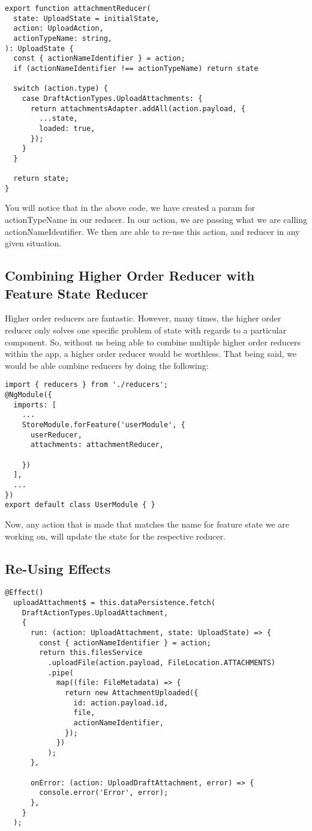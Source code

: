 \begin{lstlisting}
export function attachmentReducer(
  state: UploadState = initialState,
  action: UploadAction,
  actionTypeName: string,
): UploadState {
  const { actionNameIdentifier } = action;
  if (actionNameIdentifier !== actionTypeName) return state

  switch (action.type) {
    case DraftActionTypes.UploadAttachments: {
      return attachmentsAdapter.addAll(action.payload, {
        ...state,
        loaded: true,
      });
    }
  }

  return state;
}
\end{lstlisting}

You will notice that in the above code, we have created a param for
actionTypeName in our reducer. In our action, we are passing what we are calling
actionNameIdentifier. We then are able to re-use this action, and reducer in any
given situation.

\subsection{Combining Higher Order Reducer with Feature State Reducer }

Higher order reducers are fantastic. However, many times, the higher order
reducer only solves one specific problem of state with regards to a particular
component. So, without us being able to combine multiple higher order reducers
within the app, a higher order reducer would be worthless. That being said, we
would be able combine reducers by doing the following:

\begin{lstlisting}
import { reducers } from './reducers';
@NgModule({
  imports: [
    ...
    StoreModule.forFeature('userModule', {
      userReducer,
      attachments: attachmentReducer,

    })
  ],
  ...
})
export default class UserModule { }
\end{lstlisting}

Now, any action that is made that matches the name for feature state we are
working on, will update the state for the respective reducer.

\subsection{Re-Using Effects}
\begin{lstlisting}
@Effect()
  uploadAttachment$ = this.dataPersistence.fetch(
    DraftActionTypes.UploadAttachment,
    {
      run: (action: UploadAttachment, state: UploadState) => {
        const { actionNameIdentifier } = action;
        return this.filesService
          .uploadFile(action.payload, FileLocation.ATTACHMENTS)
          .pipe(
            map((file: FileMetadata) => {
              return new AttachmentUploaded({
                id: action.payload.id,
                file,
                actionNameIdentifier,
              });
            })
          );
      },

      onError: (action: UploadDraftAttachment, error) => {
        console.error('Error', error);
      },
    }
  );
\end{lstlisting}


